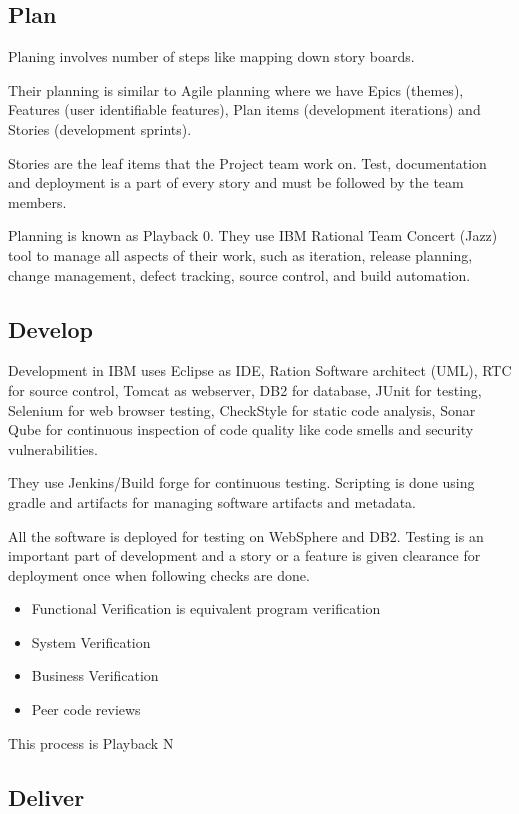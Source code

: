 \documentclass[10pt]{article}
\begin{document}
\subsection{Plan}

Planing involves number of steps like mapping down story boards.

Their planning is similar to Agile planning where we have Epics (themes), Features (user identifiable features), Plan items (development iterations) and Stories (development sprints).

Stories are the leaf items that the Project team work on. Test, documentation and deployment is a part of every story and must be followed by the team members.

Planning is known as Playback 0. They use IBM Rational Team Concert (Jazz) tool to manage all aspects of their work, such as iteration, release planning, change management, defect tracking, source control, and build automation.

\subsection{Develop}

Development in IBM uses Eclipse as IDE, Ration Software architect (UML), RTC for source control, Tomcat as webserver, DB2 for database, JUnit for testing, Selenium for web browser testing, CheckStyle for static code analysis, Sonar Qube for continuous inspection of code quality like code smells and security vulnerabilities.

They use Jenkins/Build forge for continuous testing. Scripting is done using gradle and artifacts for managing software artifacts and metadata.

All the software is deployed for testing on WebSphere and DB2. Testing is an important part of development and a story or a feature is given clearance for deployment once when following checks are done.

\begin{itemize}
    \item Functional Verification is equivalent program verification
    \item System Verification
    \item Business Verification
    \item Peer code reviews
\end{itemize}

This process is Playback N

\subsection{Deliver}
\end{document}
